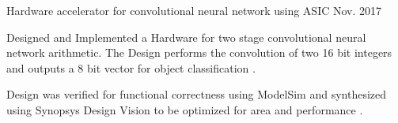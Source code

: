 \begin{cvprojects}
    \cvproject
    {Hardware accelerator for convolutional neural network using ASIC }
    {\color{darkgray}Nov. 2017}
    {
      \begin{cvprojectitems}
        \item {Designed and Implemented a Hardware for two stage convolutional neural network arithmetic. The Design performs the convolution of two 16 bit integers and outputs a 8 bit vector for object classification . }
        \item {Design was verified for functional correctness using ModelSim and synthesized using Synopsys Design Vision to be optimized for area and performance .} 
      \end{cvprojectitems}
    }

\end{cvprojects}